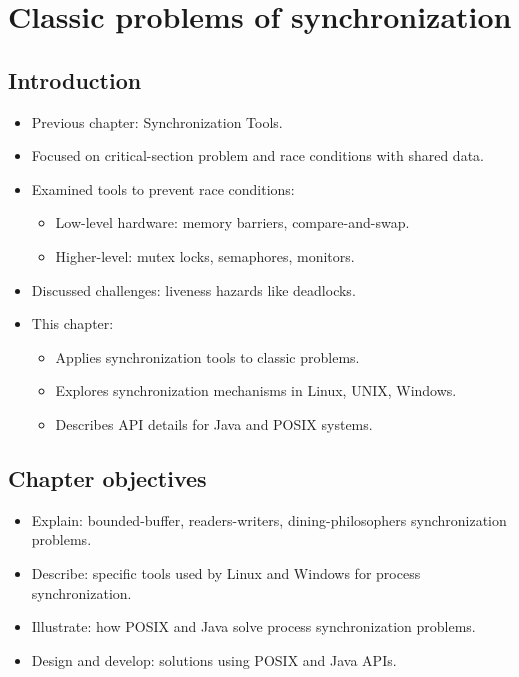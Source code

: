 \section{Classic problems of synchronization}

\subsection{Introduction}
\begin{itemize}
    \item Previous chapter: Synchronization Tools.
    \item Focused on critical-section problem and race conditions with shared data.
    \item Examined tools to prevent race conditions:
    \begin{itemize}
        \item Low-level hardware: memory barriers, compare-and-swap.
        \item Higher-level: mutex locks, semaphores, monitors.
    \end{itemize}
    \item Discussed challenges: liveness hazards like deadlocks.
    \item This chapter:
    \begin{itemize}
        \item Applies synchronization tools to classic problems.
        \item Explores synchronization mechanisms in Linux, UNIX, Windows.
        \item Describes API details for Java and POSIX systems.
    \end{itemize}
\end{itemize}

\subsection{Chapter objectives}
\begin{itemize}
    \item Explain: bounded-buffer, readers-writers, dining-philosophers synchronization problems.
    \item Describe: specific tools used by Linux and Windows for process synchronization.
    \item Illustrate: how POSIX and Java solve process synchronization problems.
    \item Design and develop: solutions using POSIX and Java APIs.
\end{itemize}

